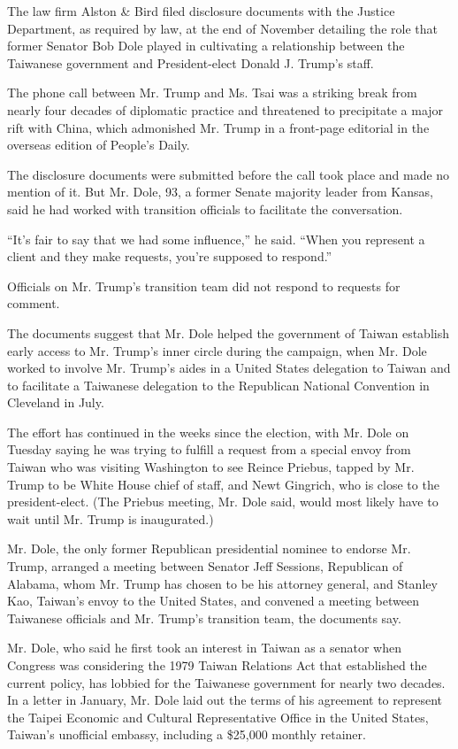 The law firm Alston \& Bird filed disclosure documents with the Justice
Department, as required by law, at the end of November detailing the
role that former Senator Bob Dole played in cultivating a relationship
between the Taiwanese government and President-elect Donald J. Trump's
staff.

The phone call between Mr. Trump and Ms. Tsai was a striking break from
nearly four decades of diplomatic practice and threatened to precipitate
a major rift with China, which admonished Mr. Trump in a front-page
editorial in the overseas edition of People's Daily.

The disclosure documents were submitted before the call took place and
made no mention of it. But Mr. Dole, 93, a former Senate majority leader
from Kansas, said he had worked with transition officials to facilitate
the conversation.

``It's fair to say that we had some influence,'' he said. ``When you
represent a client and they make requests, you're supposed to respond.''

Officials on Mr. Trump's transition team did not respond to requests for
comment.

The documents suggest that Mr. Dole helped the government of Taiwan
establish early access to Mr. Trump's inner circle during the campaign,
when Mr. Dole worked to involve Mr. Trump's aides in a United States
delegation to Taiwan and to facilitate a Taiwanese delegation to the
Republican National Convention in Cleveland in July.

The effort has continued in the weeks since the election, with Mr. Dole
on Tuesday saying he was trying to fulfill a request from a special
envoy from Taiwan who was visiting Washington to see Reince Priebus,
tapped by Mr. Trump to be White House chief of staff, and Newt Gingrich,
who is close to the president-elect. (The Priebus meeting, Mr. Dole
said, would most likely have to wait until Mr. Trump is inaugurated.)

Mr. Dole, the only former Republican presidential nominee to endorse Mr.
Trump, arranged a meeting between Senator Jeff Sessions, Republican of
Alabama, whom Mr. Trump has chosen to be his attorney general, and
Stanley Kao, Taiwan's envoy to the United States, and convened a meeting
between Taiwanese officials and Mr. Trump's transition team, the
documents say.

Mr. Dole, who said he first took an interest in Taiwan as a senator when
Congress was considering the 1979 Taiwan Relations Act that established
the current policy, has lobbied for the Taiwanese government for nearly
two decades. In a letter in January, Mr. Dole laid out the terms of his
agreement to represent the Taipei Economic and Cultural Representative
Office in the United States, Taiwan's unofficial embassy, including a
\$25,000 monthly retainer.


